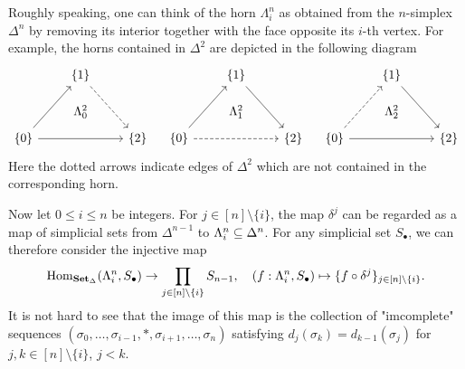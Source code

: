 \begin{example}
Roughly speaking, one can think of the horn $\Lambda_i^n$ as obtained from the $n$-simplex $\Delta^n$ by removing its interior together with the face opposite its $i$-th vertex. For example, the horns contained in $\Delta^2$ are depicted in the following diagram
\[\begin{tikzcd}[row sep=12mm,column sep=8mm]
&\{1\}\ar[d,phantom,"\Lambda_0^2"]\ar[rd,dashed]&\\
\{0\}\ar[ru]\ar[rr]&{}&\{2\}
\end{tikzcd}\quad \begin{tikzcd}[row sep=12mm,column sep=8mm]
&\{1\}\ar[d,phantom,"\Lambda_1^2"]\ar[rd]&\\
\{0\}\ar[ru]\ar[rr,dashed]&{}&\{2\}
\end{tikzcd}\quad \begin{tikzcd}[row sep=12mm,column sep=8mm]
&\{1\}\ar[d,phantom,"\Lambda_2^2"]\ar[rd]&\\
\{0\}\ar[ru,dashed]\ar[rr]&{}&\{2\}
\end{tikzcd}\]
Here the dotted arrows indicate edges of $\Delta^2$ which are not contained in the corresponding horn.\par
Now let $0\leq i\leq n$ be integers. For $j\in[n]\setminus\{i\}$, the map $\delta^j$ can be regarded as a map of simplicial sets from $\Delta^{n-1}$ to $\Lambda_i^n\subseteq\Delta^n$. For any simplicial set $S_\bullet$, we can therefore consider the injective map
\[\mathrm{Hom}_{\mathbf{Set}_\Delta}(\Lambda_i^n,S_\bullet)\to\prod_{j\in[n]\setminus\{i\}}S_{n-1},\quad (f:\Lambda_i^n,S_\bullet)\mapsto\{f\circ\delta^j\}_{j\in[n]\setminus\{i\}}.\]
It is not hard to see that the image of this map is the collection of "imcomplete" sequences $(\sigma_0,\dots,\sigma_{i-1},\ast,\sigma_{i+1},\dots,\sigma_n)$ satisfying $d_j(\sigma_k)=d_{k-1}(\sigma_j)$ for $j,k\in[n]\setminus\{i\}$, $j<k$.
\end{example}
